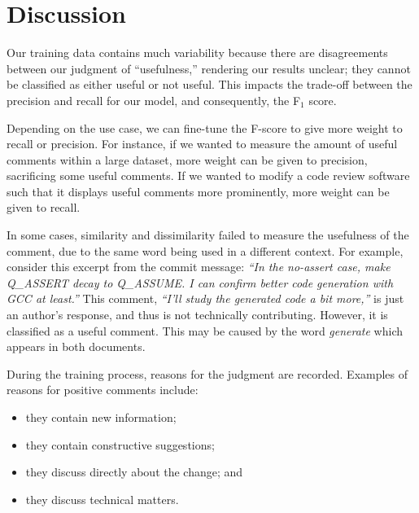 \section{Discussion}

Our training data contains much variability because there are disagreements between our judgment of ``usefulness,'' rendering our results unclear; they cannot be classified as either useful or not useful.
This impacts the trade-off between the precision and recall for our model, and consequently, the F$_1$ score.

Depending on the use case, we can fine-tune the F-score to give more weight to recall or precision.
For instance, if we wanted to measure the amount of useful comments within a large dataset, more weight can be given to precision, sacrificing some useful comments.
If we wanted to modify a code review software such that it displays useful comments more prominently, more weight can be given to recall.

In some cases, similarity and dissimilarity failed to measure the usefulness of the comment,
due to the same word being used in a different context.
For example, consider this excerpt from the commit message: \emph{``In the no-assert case, make Q\_ASSERT decay to Q\_ASSUME. I can confirm
better code generation with GCC at least.''}
This comment, \emph{``I'll study the generated code a bit more,''} is just an author's response, and thus is not technically contributing. However, it is classified as a useful comment. This may be caused by the word \emph{generate} which appears in both documents.

During the training process, reasons for the judgment are recorded. Examples of reasons for positive comments include:

\begin{itemize}
	\item they contain new information;
	\item they contain constructive suggestions;
	\item they discuss directly about the change; and
	\item they discuss technical matters.
\end{itemize}

